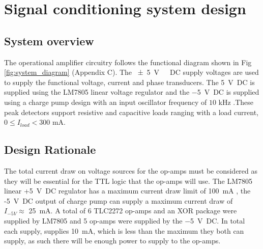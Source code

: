 \chapter{Signal conditioning system design}
\section{System overview} \label{sec:system}
The operational amplifier circuitry follows the functional diagram shown in Fig \ref{fig:system_diagram} (Appendix C).
The \SI{+-5}{\volt \ DC} supply voltages are used to supply the functional voltage, current and phase transducers. The  \SI{+5}{\volt DC} is supplied using the LM7805 linear voltage regulator \cite{LM7805} and the \SI{-5}{\volt  DC} is supplied using a charge pump design with an input  oscillator frequency of $10$ \si{\kilo\hertz} .These peak detectors support resistive and capacitive loads ranging with a load current, $0 \leq I_{load}< 300$ \si{\milli\ampere}.


\section{Design Rationale} \label{sec:current_rationale}
The total current draw on voltage sources for the op-amps must be considered as they will be essential for the TTL logic \cite{TTL_logic} that the op-amps will use. The  LM7805 linear +\SI{5}{\volt DC} regulator has a maximum current draw limit of \SI{100}{\milli\ampere} \cite{LM7805}, the \\-\SI{5}{\volt DC} output of charge pump can supply a maximum current draw of \\$I_{-5V} \approx$ \SI{25}{\milli\ampere}. A total of 6 TLC2272 \cite{TLC2272} op-amps and an XOR package were supplied by LM7805 and 5 op-amps were supplied by the \SI{-5}{\volt DC}. In total each supply, supplies \SI{10}{\milli\ampere}, which is less than the maximum they both can supply, as such there will be enough power to supply to the op-amps.







